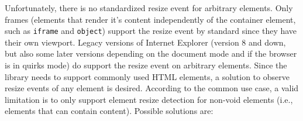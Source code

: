\documentclass[a4paper,11pt]{kth-mag}
\newcommand{\code}[1]{\texttt{#1}}
\begin{document}
        Unfortunately, there is no standardized resize event for arbitrary \glspl{element}.
        Only frames (\glspl{element} that render it's content independently of the container \gls{element}, such as \code{iframe} and \code{object}) support the resize event by standard since they have their own \gls{viewport}.
        Legacy versions of Internet Explorer (version 8 and down, but also some later versions depending on the \gls{document} mode and if the \gls{browser} is in quirks mode) do support the resize event on arbitrary \glspl{element}.
        Since the library needs to support commonly used \gls{HTML} \glspl{element}, a solution to observe resize events of any \gls{element} is desired.
        According to the common use case, a valid limitation is to only support element resize detection for non-void elements (i.e., elements that can contain content).
        Possible solutions are:
\end{document}
